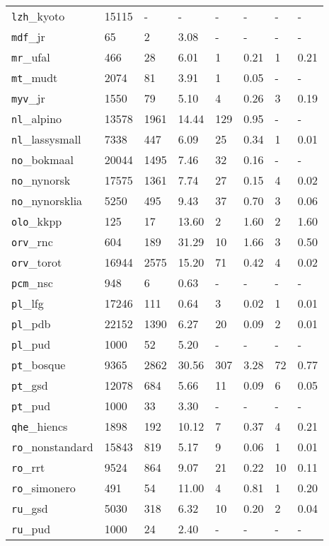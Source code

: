 \begin{longtable}{|l|l|l|l|l|l|l|l|}
\texttt{lzh}\_kyoto & 15115 & - & - & - & - & - & -\\
\texttt{mdf}\_jr & 65 & 2 & 3.08 & - & - & - & -\\
\texttt{mr}\_ufal & 466 & 28 & 6.01 & 1 & 0.21 & 1 & 0.21\\
\texttt{mt}\_mudt & 2074 & 81 & 3.91 & 1 & 0.05 & - & -\\
\texttt{myv}\_jr & 1550 & 79 & 5.10 & 4 & 0.26 & 3 & 0.19\\
\texttt{nl}\_alpino & 13578 & 1961 & 14.44 & 129 & 0.95 & - & -\\
\texttt{nl}\_lassysmall & 7338 & 447 & 6.09 & 25 & 0.34 & 1 & 0.01\\
\texttt{no}\_bokmaal & 20044 & 1495 & 7.46 & 32 & 0.16 & - & -\\
\texttt{no}\_nynorsk & 17575 & 1361 & 7.74 & 27 & 0.15 & 4 & 0.02\\
\texttt{no}\_nynorsklia & 5250 & 495 & 9.43 & 37 & 0.70 & 3 & 0.06\\
\texttt{olo}\_kkpp & 125 & 17 & 13.60 & 2 & 1.60 & 2 & 1.60\\
\texttt{orv}\_rnc & 604 & 189 & 31.29 & 10 & 1.66 & 3 & 0.50\\
\texttt{orv}\_torot & 16944 & 2575 & 15.20 & 71 & 0.42 & 4 & 0.02\\
\texttt{pcm}\_nsc & 948 & 6 & 0.63 & - & - & - & -\\
\texttt{pl}\_lfg & 17246 & 111 & 0.64 & 3 & 0.02 & 1 & 0.01\\
\texttt{pl}\_pdb & 22152 & 1390 & 6.27 & 20 & 0.09 & 2 & 0.01\\
\texttt{pl}\_pud & 1000 & 52 & 5.20 & - & - & - & -\\
\texttt{pt}\_bosque & 9365 & 2862 & 30.56 & 307 & 3.28 & 72 & 0.77\\
\texttt{pt}\_gsd & 12078 & 684 & 5.66 & 11 & 0.09 & 6 & 0.05\\
\texttt{pt}\_pud & 1000 & 33 & 3.30 & - & - & - & -\\
\texttt{qhe}\_hiencs & 1898 & 192 & 10.12 & 7 & 0.37 & 4 & 0.21\\
\texttt{ro}\_nonstandard & 15843 & 819 & 5.17 & 9 & 0.06 & 1 & 0.01\\
\texttt{ro}\_rrt & 9524 & 864 & 9.07 & 21 & 0.22 & 10 & 0.11\\
\texttt{ro}\_simonero & 491 & 54 & 11.00 & 4 & 0.81 & 1 & 0.20\\
\texttt{ru}\_gsd & 5030 & 318 & 6.32 & 10 & 0.20 & 2 & 0.04\\
\texttt{ru}\_pud & 1000 & 24 & 2.40 & - & - & - & -\\

\end{longtable}
